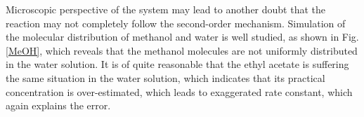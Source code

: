 \documentclass[%
 reprint,
 amsmath,amssymb,
 aps,
10.5pt,
]{revtex4-1}
\begin{document}
Microscopic perspective of the system may lead to another doubt that the reaction may not completely follow the second-order mechanism. Simulation of the molecular distribution of methanol and water is well studied, as shown in Fig.\ref{MeOH}, which reveals that the methanol molecules are not uniformly distributed in the water solution. It is of quite reasonable that the ethyl acetate is suffering the same situation in the water solution, which indicates that its practical concentration is over-estimated, which leads to exaggerated rate constant, which again explains the error. 



\end{document}
